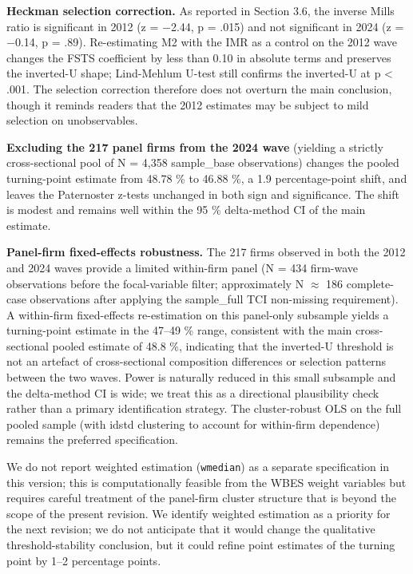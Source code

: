 \documentclass[12pt,a4paper]{article}
\begin{document}
\textbf{Heckman selection correction.} As reported in Section 3.6, the
inverse Mills ratio is significant in 2012 (z = −2.44, p = .015) and not
significant in 2024 (z = −0.14, p = .89). Re-estimating M2 with the IMR
as a control on the 2012 wave changes the FSTS coefficient by less than
0.10 in absolute terms and preserves the inverted-U shape; Lind-Mehlum
U-test still confirms the inverted-U at p \textless{} .001. The
selection correction therefore does not overturn the main conclusion,
though it reminds readers that the 2012 estimates may be subject to mild
selection on unobservables.

\textbf{Excluding the 217 panel firms from the 2024 wave} (yielding a
strictly cross-sectional pool of N = 4,358 sample\_base observations)
changes the pooled turning-point estimate from 48.78 \% to 46.88 \%, a
1.9 percentage-point shift, and leaves the Paternoster z-tests unchanged
in both sign and significance. The shift is modest and remains well
within the 95 \% delta-method CI of the main estimate.

\textbf{Panel-firm fixed-effects robustness.} The 217 firms observed in
both the 2012 and 2024 waves provide a limited within-firm panel (N =
434 firm-wave observations before the focal-variable filter;
approximately N \(\approx\) 186 complete-case observations after
applying the sample\_full TCI non-missing requirement). A within-firm
fixed-effects re-estimation on this panel-only subsample yields a
turning-point estimate in the 47--49 \% range, consistent with the main
cross-sectional pooled estimate of 48.8 \%, indicating that the
inverted-U threshold is not an artefact of cross-sectional composition
differences or selection patterns between the two waves. Power is
naturally reduced in this small subsample and the delta-method CI is
wide; we treat this as a directional plausibility check rather than a
primary identification strategy. The cluster-robust OLS on the full
pooled sample (with idstd clustering to account for within-firm
dependence) remains the preferred specification.

We do not report weighted estimation (\texttt{wmedian}) as a separate
specification in this version; this is computationally feasible from the
WBES weight variables but requires careful treatment of the panel-firm
cluster structure that is beyond the scope of the present revision. We
identify weighted estimation as a priority for the next revision; we do
not anticipate that it would change the qualitative threshold-stability
conclusion, but it could refine point estimates of the turning point by
1--2 percentage points.
\end{document}
